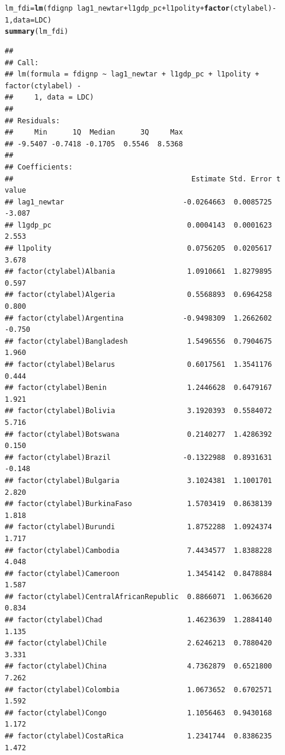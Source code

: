 \documentclass[12pt]{article}\usepackage[]{graphicx}\usepackage[]{color}
\makeatletter
\newcommand{\hlnum}[1]{\textcolor[rgb]{0.686,0.059,0.569}{#1}}%
\newcommand{\hlopt}[1]{\textcolor[rgb]{0,0,0}{#1}}%
\newcommand{\hlstd}[1]{\textcolor[rgb]{0.345,0.345,0.345}{#1}}%
\newcommand{\hlkwb}[1]{\textcolor[rgb]{0.69,0.353,0.396}{#1}}%
\newcommand{\hlkwc}[1]{\textcolor[rgb]{0.333,0.667,0.333}{#1}}%
\newcommand{\hlkwd}[1]{\textcolor[rgb]{0.737,0.353,0.396}{\textbf{#1}}}%
\newenvironment{kframe}{%
 \def\at@end@of@kframe{}%
 \ifinner\ifhmode%
  \def\at@end@of@kframe{\end{minipage}}%
  \begin{minipage}{\columnwidth}%
 \fi\fi%
 \def\FrameCommand##1{\hskip\@totalleftmargin \hskip-\fboxsep
 \colorbox{shadecolor}{##1}\hskip-\fboxsep
     \hskip-\linewidth \hskip-\@totalleftmargin \hskip\columnwidth}%
 \MakeFramed {\advance\hsize-\width
   \@totalleftmargin\z@ \linewidth\hsize
   \@setminipage}}%
 {\par\unskip\endMakeFramed%
 \at@end@of@kframe}
\newenvironment{knitrout}{}{} %
\makeatother
\begin{document}
\begin{knitrout}
\color{fgcolor}\begin{kframe}
\begin{alltt}
\hlstd{lm_fdi} \hlkwb{=} \hlkwd{lm}\hlstd{(fdignp} \hlopt{~} \hlstd{lag1_newtar} \hlopt{+} \hlstd{l1gdp_pc} \hlopt{+} \hlstd{l1polity} \hlopt{+} \hlkwd{factor}\hlstd{(ctylabel)} \hlopt{-}
    \hlnum{1}\hlstd{,} \hlkwc{data} \hlstd{= LDC)}
\hlkwd{summary}\hlstd{(lm_fdi)}
\end{alltt}
\begin{verbatim}
## 
## Call:
## lm(formula = fdignp ~ lag1_newtar + l1gdp_pc + l1polity + factor(ctylabel) - 
##     1, data = LDC)
## 
## Residuals:
##     Min      1Q  Median      3Q     Max 
## -9.5407 -0.7418 -0.1705  0.5546  8.5368 
## 
## Coefficients:
##                                          Estimate Std. Error t value
## lag1_newtar                            -0.0264663  0.0085725  -3.087
## l1gdp_pc                                0.0004143  0.0001623   2.553
## l1polity                                0.0756205  0.0205617   3.678
## factor(ctylabel)Albania                 1.0910661  1.8279895   0.597
## factor(ctylabel)Algeria                 0.5568893  0.6964258   0.800
## factor(ctylabel)Argentina              -0.9498309  1.2662602  -0.750
## factor(ctylabel)Bangladesh              1.5496556  0.7904675   1.960
## factor(ctylabel)Belarus                 0.6017561  1.3541176   0.444
## factor(ctylabel)Benin                   1.2446628  0.6479167   1.921
## factor(ctylabel)Bolivia                 3.1920393  0.5584072   5.716
## factor(ctylabel)Botswana                0.2140277  1.4286392   0.150
## factor(ctylabel)Brazil                 -0.1322988  0.8931631  -0.148
## factor(ctylabel)Bulgaria                3.1024381  1.1001701   2.820
## factor(ctylabel)BurkinaFaso             1.5703419  0.8638139   1.818
## factor(ctylabel)Burundi                 1.8752288  1.0924374   1.717
## factor(ctylabel)Cambodia                7.4434577  1.8388228   4.048
## factor(ctylabel)Cameroon                1.3454142  0.8478884   1.587
## factor(ctylabel)CentralAfricanRepublic  0.8866071  1.0636620   0.834
## factor(ctylabel)Chad                    1.4623639  1.2884140   1.135
## factor(ctylabel)Chile                   2.6246213  0.7880420   3.331
## factor(ctylabel)China                   4.7362879  0.6521800   7.262
## factor(ctylabel)Colombia                1.0673652  0.6702571   1.592
## factor(ctylabel)Congo                   1.1056463  0.9430168   1.172
## factor(ctylabel)CostaRica               1.2341744  0.8386235   1.472

\end{verbatim}
\end{kframe}
\end{knitrout}
\end{document}
